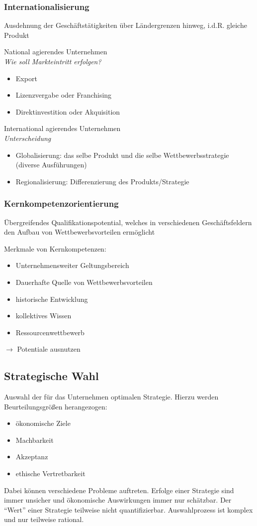 \documentclass[a4paper,11pt, twoside]{article}
\newcommand\mpar[1]{\marginpar {\flushleft\small #1}}
\begin{document}
\subsubsection*{Internationalisierung} 
Ausdehnung der Geschäftstätigkeiten über Ländergrenzen hinweg, i.d.R. gleiche Produkt

National agierendes Unternehmen\\ 
\textit{Wie soll Markteintritt erfolgen?}
\begin{itemize}
	\item Export
	\item Lizenzvergabe oder Franchising
	\item Direktinvestition oder Akquisition
\end{itemize}

\mpar{\textcolor{red}{Steuern/Gesetzte nehmen Einfluss}}
International agierendes Unternehmen\\
\textit{Unterscheidung}\\
\begin{itemize}
	\item Globalisierung: das selbe Produkt und die selbe Wettbewerbsstrategie (diverse Ausführungen)
	\item Regionalisierung: Differenzierung des Produkts/Strategie
\end{itemize}

\subsubsection*{Kernkompetenzorientierung} 
Übergreifendes Qualifikationspotential, welches in verschiedenen Geschäftsfeldern den Aufbau von Wettbewerbsvorteilen ermöglicht

Merkmale von Kernkompetenzen:
\begin{itemize}
	\item Unternehmensweiter Geltungsbereich
	\item Dauerhafte Quelle von Wettbewerbsvorteilen
	\item historische Entwicklung
	\item kollektives Wissen
	\item Ressourcenwettbewerb
\end{itemize}
$\rightarrow$ Potentiale ausnutzen

\subsection{Strategische Wahl}
Auswahl der für das Unternehmen optimalen Strategie. Hierzu werden Beurteilungsgrößen herangezogen:
\begin{itemize}
	\item ökonomische Ziele
	\item Machbarkeit
	\item Akzeptanz
	\item ethische Vertretbarkeit
\end{itemize}
Dabei können verschiedene Probleme auftreten. Erfolge einer Strategie sind immer unsicher und ökonomische Auswirkungen immer nur schätzbar. Der "`Wert"' einer Strategie teilweise nicht quantifizierbar. Auswahlprozess ist komplex und nur teilweise rational.
 
\end{document}
